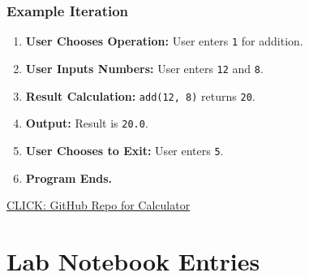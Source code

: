 \documentclass{article}
\begin{document}
\subsubsection*{Example Iteration}

\begin{enumerate}
    \item \textbf{User Chooses Operation:} User enters \texttt{1} for addition.
    \item \textbf{User Inputs Numbers:} User enters \texttt{12} and \texttt{8}.
    \item \textbf{Result Calculation:} \texttt{add(12, 8)} returns \texttt{20}.
    \item \textbf{Output:} Result is \texttt{20.0}.
    \item \textbf{User Chooses to Exit:} User enters \texttt{5}.
    \item \textbf{Program Ends.}
\end{enumerate}

\href{https://github.com/joyosmita/calculator}{CLICK: GitHub Repo for Calculator}


\newpage
\newpage
\section*{Lab Notebook Entries}
\end{document}
